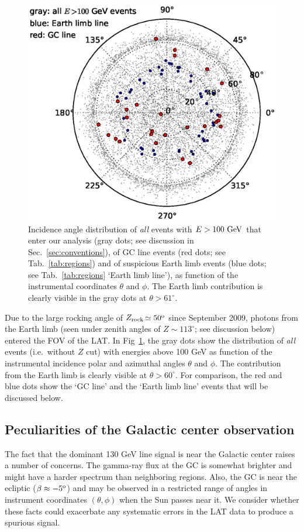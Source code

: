 \documentclass[aps,twocolumn,prd,superscriptaddress,showpacs,nofootinbib,fixfloat]{revtex4}
\newcommand{\GeV}{{\rm ~GeV}}
\newcommand{\degree}{^{\rm o}}
\newcommand{\zrock}{$Z_{\rm rock}$}
\begin{document}
\begin{figure}[h]
  \begin{center}
    \includegraphics[width=0.9\linewidth]{plots/polarCounts.eps}
    \vspace{-0.5cm}
  \end{center}
  \caption{Incidence angle distribution of \emph{all} events with $E>100\GeV$
  that enter our analysis (gray dots; see discussion in
  Sec.~\ref{sec:conventions}), of GC line events (red dots; see
  Tab.~\ref{tab:regions}) and of suspicious Earth limb events (blue dots; see
  Tab.~\ref{tab:regions} `Earth limb line'), as function of the instrumental
  coordinates $\theta$ and $\phi$. The Earth limb contribution is clearly
  visible in the gray dots at $\theta > 61^\circ$.}
  \label{fig:phiThetaDist}
\end{figure}

Due to the large rocking angle of \zrock$\simeq50\degree$ since September
2009, photons from the Earth limb (seen under zenith angles of
$Z\sim113^\circ$; see discussion below) entered the FOV of the LAT. In
Fig~\ref{fig:phiThetaDist}, the gray dots show the distribution of \emph{all}
events (i.e.~without $Z$ cut) with energies above 100 GeV as function of the
instrumental incidence polar and azimuthal angles $\theta$ and $\phi$. The
contribution from the Earth limb is clearly visible at $\theta>60^\circ$. For
comparison, the red and blue dots show the `GC line' and the `Earth limb line'
events that will be discussed below.

\subsection{Peculiarities of the Galactic center observation}
The fact that the dominant 130 GeV line signal is near the Galactic center
raises a number of concerns.  The gamma-ray flux at the GC is somewhat
brighter and might have a harder spectrum than neighboring regions. Also, the
GC is near the ecliptic ($\beta \approx -5\degree$) and may be observed in a
restricted range of angles in instrument coordinates $(\theta, \phi)$ when the
Sun passes near it.  We consider whether these facts could exacerbate any
systematic errors in the LAT data to produce a spurious signal.
\end{document}
